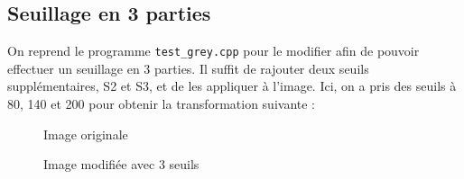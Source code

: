 \documentclass[french,a4paper,10pt]{article}
\begin{document}
	\subsection{Seuillage en 3 parties}\label{subsec:2.1}
	On reprend le programme \texttt{test\_grey.cpp} pour le modifier afin de pouvoir effectuer un seuillage en 3
	parties.
	Il suffit de rajouter deux seuils supplémentaires, S2 et S3, et de les appliquer à l'image.
	Ici, on a pris des seuils à 80, 140 et 200 pour obtenir la transformation suivante :
	\begin{figure}[!htb]
		\begin{minipage}{0.48\textwidth}
			\centering
			\caption{Image originale}\label{Fig:orig-08-2}
		\end{minipage}\hfill
		\begin{minipage}{0.48\textwidth}
			\centering
			\caption{Image modifiée avec 3 seuils}\label{Fig:test-grey-08-3}
		\end{minipage}
	\end{figure}
\end{document}
